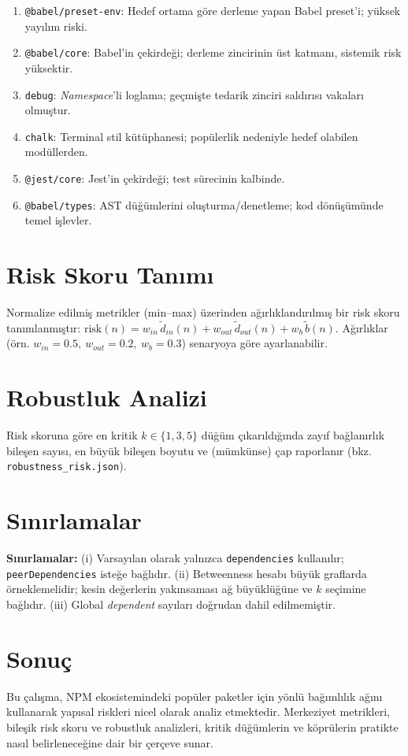 \documentclass[11pt,a4paper]{article}
\begin{document}
\begin{enumerate}
  \item \texttt{@babel/preset-env}: Hedef ortama göre derleme yapan Babel preset'i; yüksek yayılım riski.
  \item \texttt{@babel/core}: Babel'in çekirdeği; derleme zincirinin üst katmanı, sistemik risk yüksektir.
  \item \texttt{debug}: \emph{Namespace}'li loglama; geçmişte tedarik zinciri saldırısı vakaları olmuştur.
  \item \texttt{chalk}: Terminal stil kütüphanesi; popülerlik nedeniyle hedef olabilen modüllerden.
  \item \texttt{@jest/core}: Jest'in çekirdeği; test sürecinin kalbinde.
  \item \texttt{@babel/types}: AST düğümlerini oluşturma/denetleme; kod dönüşümünde temel işlevler.
\end{enumerate}

\section{Risk Skoru Tanımı}
Normalize edilmiş metrikler (min--max) üzerinden ağırlıklandırılmış bir risk skoru tanımlanmıştır: $\mathrm{risk}(n) = w_{in} \, \tilde d_{in}(n) + w_{out} \, \tilde d_{out}(n) + w_b \, \tilde b(n)$. Ağırlıklar (örn. $w_{in}=0.5,\ w_{out}=0.2,\ w_b=0.3$) senaryoya göre ayarlanabilir.

\section{Robustluk Analizi}
Risk skoruna göre en kritik $k\in\{1,3,5\}$ düğüm çıkarıldığında zayıf bağlanırlık bileşen sayısı, en büyük bileşen boyutu ve (mümkünse) çap raporlanır (bkz. \texttt{robustness\_risk.json}).

\section{Sınırlamalar}
\textbf{Sınırlamalar:} (i) Varsayılan olarak yalnızca \texttt{dependencies} kullanılır; \texttt{peerDependencies} isteğe bağlıdır. (ii) Betweenness hesabı büyük graflarda örneklemelidir; kesin değerlerin yakınsaması ağ büyüklüğüne ve $k$ seçimine bağlıdır. (iii) Global \emph{dependent} sayıları doğrudan dahil edilmemiştir.

\section{Sonuç}
Bu çalışma, NPM ekosistemindeki popüler paketler için yönlü bağımlılık ağını kullanarak yapısal riskleri nicel olarak analiz etmektedir. Merkeziyet metrikleri, bileşik risk skoru ve robustluk analizleri, kritik düğümlerin ve köprülerin pratikte nasıl belirleneceğine dair bir çerçeve sunar.
\end{document}

